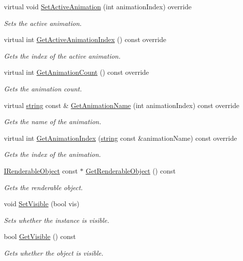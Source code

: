 \begin{DoxyCompactItemize}
virtual void \hyperlink{class_object_instance_a9628216a9ea2cd68f3b2163718517fa4}{Set\+Active\+Animation} (int animation\+Index) override
\begin{DoxyCompactList}\small\item\em Sets the active animation. \end{DoxyCompactList}\item 
virtual int \hyperlink{class_object_instance_a8012a0c7dbe376714997c9a4848d1dca}{Get\+Active\+Animation\+Index} () const  override
\begin{DoxyCompactList}\small\item\em Gets the index of the active animation. \end{DoxyCompactList}\item 
virtual int \hyperlink{class_object_instance_ae49dc1d9e6b86bd109b9ff67451b4b1f}{Get\+Animation\+Count} () const  override
\begin{DoxyCompactList}\small\item\em Gets the animation count. \end{DoxyCompactList}\item 
virtual \hyperlink{_types_8h_ad453f9f71ce1f9153fb748d6bb25e454}{string} const \& \hyperlink{class_object_instance_a249323ec3456eb98658ea0135c3bbdab}{Get\+Animation\+Name} (int animation\+Index) const  override
\begin{DoxyCompactList}\small\item\em Gets the name of the animation. \end{DoxyCompactList}\item 
virtual int \hyperlink{class_object_instance_a2daf48dc1c7680b0eccfc10351ea511b}{Get\+Animation\+Index} (\hyperlink{_types_8h_ad453f9f71ce1f9153fb748d6bb25e454}{string} const \&animation\+Name) const  override
\begin{DoxyCompactList}\small\item\em Gets the index of the animation. \end{DoxyCompactList}\item 
\hyperlink{class_i_renderable_object}{I\+Renderable\+Object} const $\ast$ \hyperlink{class_object_instance_a0094457f916c48654ce0551358469220}{Get\+Renderable\+Object} () const 
\begin{DoxyCompactList}\small\item\em Gets the renderable object. \end{DoxyCompactList}\item 
void \hyperlink{class_object_instance_abae26d0879e8db5a3e7aee6fcb080fdf}{Set\+Visible} (bool vis)
\begin{DoxyCompactList}\small\item\em Sets whether the instance is visible. \end{DoxyCompactList}\item 
bool \hyperlink{class_object_instance_a51bf8948761704cc38ffe66d4de291f1}{Get\+Visible} () const 
\begin{DoxyCompactList}\small\item\em Gets whether the object is visible. \end{DoxyCompactList}\end{DoxyCompactItemize}
